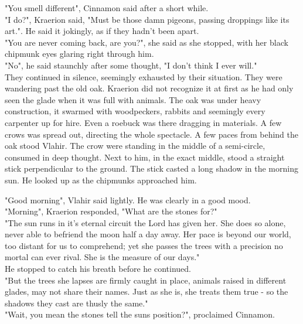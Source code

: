 \documentclass[smalldemyvopaper,11pt,twoside,onecolumn,openright,extrafontsizes]{memoir}
\newlength\drop
\begin{document}
"You smell different", Cinnamon said after a short while.\\

"I do?", Kraerion said, "Must be those damn pigeons, passing droppings like its art.". He said it jokingly, as if they hadn't been apart. \\

"You are never coming back, are you?", she said as she stopped, with her black chipmunk eyes glaring right through him. \\

"No", he said staunchly after some thought, "I don't think I ever will."\\

They continued in silence, seemingly exhausted by their situation. They were wandering past the old oak. Kraerion did not recognize it at first as he had only seen the glade when it was full with animals. The oak was under heavy construction, it swarmed with woodpeckers, rabbits and seemingly every carpenter up for hire. Even a roebuck was there dragging in materials. A few crows was spread out, directing the whole spectacle. A few paces from behind the oak stood Vlahir. The crow were standing in the middle of a semi-circle, consumed in deep thought. Next to him, in the exact middle, stood a straight stick perpendicular to the ground. The stick casted a long shadow in the morning sun. He looked up as the chipmunks approached him. 

"Good morning", Vlahir said lightly. He was clearly in a good mood. \\

"Morning", Kraerion responded, "What are the stones for?"\\

"The sun runs in it's eternal circuit the Lord has given her. She does so alone, never able to befriend the moon half a day away. Her pace is beyond our world, too distant for us to comprehend; yet she passes the trees with a precision no mortal can ever rival. She is the measure of our days."\\

He stopped to catch his breath before he continued.\\

"But the trees she lapses are firmly caught in place, animals raised in different glades, may not share their names. Just as she is, she treats them true - so the shadows they cast are thusly the same."\\

"Wait, you mean the stones tell the suns position?", proclaimed Cinnamon.\\
\end{document}
